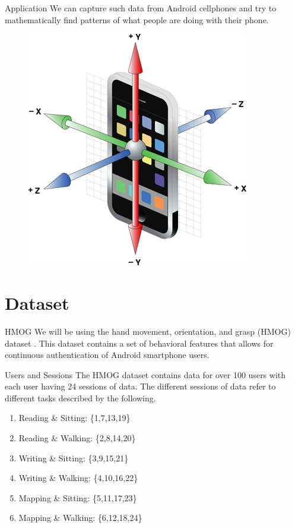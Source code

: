 \documentclass[10pt]{beamer}
\begin{document}
\begin{frame} {Application}
We can capture such data from Android  cellphones and try to mathematically find patterns of what people are doing with their phone. 
\begin{figure}
\includegraphics[scale=.4]{images/phone1.jpg}
\end{figure}
\end{frame}

\section{Dataset}

\begin{frame} {HMOG}
We will be using the hand movement, orientation, and
grasp (HMOG) dataset \cite{phone}. This dataset contains a set of behavioral features that allows for continuous authentication of Android smartphone users. 
\end{frame}

\begin{frame} {Users and Sessions}
The HMOG dataset contains data for over 100 users with each user having 24 sessions of data. The different sessions of data refer to different tasks described by the following.
\begin{enumerate}
\item Reading \& Sitting: \{1,7,13,19\}
\item Reading \& Walking: \{2,8,14,20\}
\item Writing \& Sitting: \{3,9,15,21\}
\item Writing \& Walking: \{4,10,16,22\}
\item Mapping \& Sitting: \{5,11,17,23\}
\item Mapping \& Walking: \{6,12,18,24\}
\end{enumerate}
\end{frame}
\end{document}
